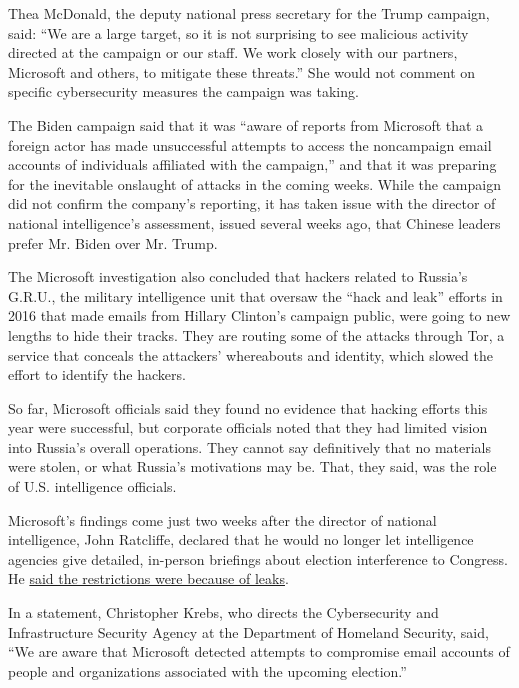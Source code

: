 Thea McDonald, the deputy national press secretary for the Trump
campaign, said: ``We are a large target, so it is not surprising to see
malicious activity directed at the campaign or our staff. We work
closely with our partners, Microsoft and others, to mitigate these
threats.'' She would not comment on specific cybersecurity measures the
campaign was taking.

The Biden campaign said that it was ``aware of reports from Microsoft
that a foreign actor has made unsuccessful attempts to access the
noncampaign email accounts of individuals affiliated with the
campaign,'' and that it was preparing for the inevitable onslaught of
attacks in the coming weeks. While the campaign did not confirm the
company's reporting, it has taken issue with the director of national
intelligence's assessment, issued several weeks ago, that Chinese
leaders prefer Mr. Biden over Mr. Trump.

The Microsoft investigation also concluded that hackers related to
Russia's G.R.U., the military intelligence unit that oversaw the ``hack
and leak'' efforts in 2016 that made emails from Hillary Clinton's
campaign public, were going to new lengths to hide their tracks. They
are routing some of the attacks through Tor, a service that conceals the
attackers' whereabouts and identity, which slowed the effort to identify
the hackers.

So far, Microsoft officials said they found no evidence that hacking
efforts this year were successful, but corporate officials noted that
they had limited vision into Russia's overall operations. They cannot
say definitively that no materials were stolen, or what Russia's
motivations may be. That, they said, was the role of U.S. intelligence
officials.

Microsoft's findings come just two weeks after the director of national
intelligence, John Ratcliffe, declared that he would no longer let
intelligence agencies give detailed, in-person briefings about election
interference to Congress. He
\href{https://www.nytimes3xbfgragh.onion/2020/08/29/us/politics/election-security-intelligence-briefings-congress.html}{said
the restrictions were because of leaks}.

In a statement, Christopher Krebs, who directs the Cybersecurity and
Infrastructure Security Agency at the Department of Homeland Security,
said, ``We are aware that Microsoft detected attempts to compromise
email accounts of people and organizations associated with the upcoming
election.''

